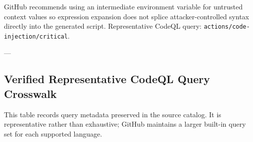 \documentclass[10pt,letterpaper]{article}
\newcommand{\code}[1]{\texttt{\small #1}}
\begin{document}
GitHub recommends using an intermediate environment variable for untrusted context values so expression expansion does not splice attacker-controlled syntax directly into the generated script. Representative CodeQL query: \code{actions/code-injection/critical}.\par

---\par
\clearpage
\begin{landscape}
\section{Verified Representative CodeQL Query Crosswalk}
This table records query metadata preserved in the source catalog. It is representative rather than exhaustive; GitHub maintains a larger built-in query set for each supported language.


\end{landscape}
\end{document}
